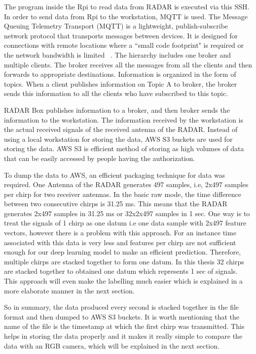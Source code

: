 The program inside the Rpi to read data from RADAR is executed via this SSH. In order to send data from Rpi to the workstation, MQTT is used. The Message Queuing Telemetry Transport (MQTT) is a lightweight, publish-subscribe network protocol that transports messages between devices. It is designed for connections with remote locations where a ``small code footprint" is required or the network bandwidth is limited ~\cite{wikipedia_mqtt}. The hierarchy includes one broker and multiple clients. The broker receives all the messages from all the clients and then forwards to appropriate destinations. Information is organized in the form of topics. When a client publishes information on Topic A to broker, the broker sends this information to all the clients who have subscribed to this topic.

RADAR Box publishes information to a broker, and then broker sends the information to the workstation. The information received by the workstation is the actual received signals of the received antenna of the RADAR.  Instead of using a local workstation for storing the data, AWS S3 buckets are used for storing the data. AWS S3 is efficient method of storing as high volumes of data that can be easily accessed by people having the authorization.


To dump the data to AWS, an efficient packaging technique for data was required. One Antenna of the RADAR generates 497 samples, i.e, 2x497 samples per chirp for two receiver antennas. In the basic raw mode, the time difference between two consecutive chirps is 31.25 ms. This means that the RADAR generates 2x497 samples in 31.25 ms or 32x2x497 samples in 1 sec. 
One way is to treat the signals of 1 chirp as one datum i.e one data sample with 2x497 feature vectors, however there is  a problem with this approach. For an instance time associated with this data is very less and features per chirp are not sufficient enough for our deep learning model to make an efficient prediction. Therefore, multiple chirps are stacked together to form one datum. In this thesis 32 chirps are stacked together to obtained one datum which represents 1 sec of signals. This approach will even make the labelling much easier which is explained in a more elaborate manner in the next section.

So in summary, the data produced every second is stacked together in the file format and then dumped to AWS S3 buckets. It is worth mentioning that the name of the file is the timestamp at which the first chirp was transmitted. This helps in storing the data properly and it makes it really simple to compare the data with an RGB camera, which will be explained in the next section.



